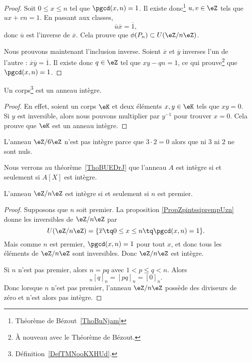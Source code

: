\begin{proof}
	Soit \( 0\leq x\leq n\) tel que \( \pgcd(x,n)=1\). Il existe donc\footnote{Théorème de Bézout~\ref{ThoBuNjam}} \( u,v\in\eZ\) tels que \( ux+vn=1\). En passant aux classes,
	\begin{equation}
		\overline u\overline x=\overline 1,
	\end{equation}
	donc \( \overline u\) est l'inverse de \( \overline x\). Cela prouve que \( \phi(P_n)\subset U(\eZ/n\eZ)\).

	Nous prouvons maintenant l'inclusion inverse. Soient \( \overline x\) et \( \overline y\) inverses l'un de l'autre : \( \overline x\overline y=\overline 1\). Il existe donc \( q\in\eZ\) tel que \( xy-qn=1\), ce qui prouve\footnote{À nouveau avec le Théorème de Bézout.} que \( \pgcd(x,n)=1\).
\end{proof}

\begin{lemma}     \label{LEMooZSMEooUmSXWZ}
	Un corps\footnote{Définition~\ref{DefTMNooKXHUd}.} est un anneau intègre.
\end{lemma}

\begin{proof}
	En effet, soient un corps \( \eK\) et deux éléments \( x,y\in \eK\) tels que \( xy=0\). Si \( y\) est inversible, alors nous pouvons multiplier par \( y^{-1}\) pour trouver \( x=0\). Cela prouve que \( \eK\) est un anneau intègre.
\end{proof}


\begin{example}
	L'anneau \( \eZ/6\eZ\) n'est pas intègre parce que \( 3\cdot 2=0\) alors que ni \( 3\) ni \( 2\) ne sont nuls.
\end{example}

Nous verrons au théorème~\ref{ThoBUEDrJ} que l'anneau \( A\) est intègre si et seulement si \( A[X]\) est intègre.

\begin{corollary}   \label{CorZnInternprem}
	L'anneau \( \eZ/n\eZ\) est intègre si et seulement si \( n\) est premier.
\end{corollary}

\begin{proof}
	Supposons que \( n\) soit premier. La proposition \ref{PropZpintssiprempUzn} donne les inversibles de \( \eZ/n\eZ\) par
	\begin{equation}
		U(\eZ/n\eZ)=\{ \overline x\tq 0\leq x\leq n\tq\pgcd(x,n)=1 \}.
	\end{equation}
	Mais comme \( n\) est premier, \( \pgcd(x,n)=1\) pour tout \( x\), et donc tous les éléments de \( \eZ/n\eZ\) sont inversibles. Donc \( \eZ/n\eZ\) est intègre.

	Si \( n\) n'est pas premier, alors \( n=pq\) avec \( 1<p\leq q<n\). Alors
	\begin{equation}
		[p]_n[q]_n=[pq]_n=[0]_n.
	\end{equation}
	Donc lorsque \( n\) n'est pas premier,  l'anneau \( \eZ/n\eZ\) possède des diviseurs de zéro et n'est alors pas intègre.
\end{proof}



